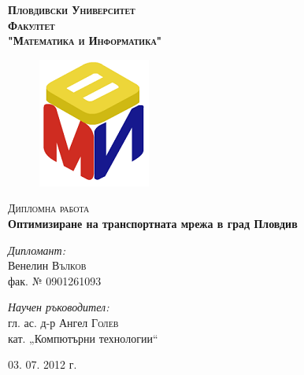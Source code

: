 
\begin{titlepage}

\begin{center}

\textsc{\huge \bfseries Пловдивски Университет}\\[1.0cm]
\textsc{\LARGE \bfseries Факултет \\"Математика и Информатика"}\\[1.5cm]

\begin{figure}[htb]
	\centering
	\includegraphics[scale=0.8]{assets/fmi-logo.png}
\end{figure}

\textsc{\Large Дипломна работа}\\[1.5cm]

{ \huge \bfseries Оптимизиране на транспортната мрежа в град Пловдив}\\[2.0cm]

\begin{minipage}{0.4\textwidth}
\begin{flushleft} \large
\emph{Дипломант:}\\
Венелин \textsc{Вълков} \\
\small
фак. № 0901261093
\end{flushleft}
\end{minipage}
\begin{minipage}{0.4\textwidth}
\begin{flushright} \large
\emph{Научен ръководител:} \\
гл. ас. д-р Ангел \textsc{Голев} \\
\small
кат. \nolinebreak[4] „Компютърни \nolinebreak[4] технологии“ 
\end{flushright}
\end{minipage}

\vfill

{\large 03. 07. 2012 г.}

\end{center}

\end{titlepage}